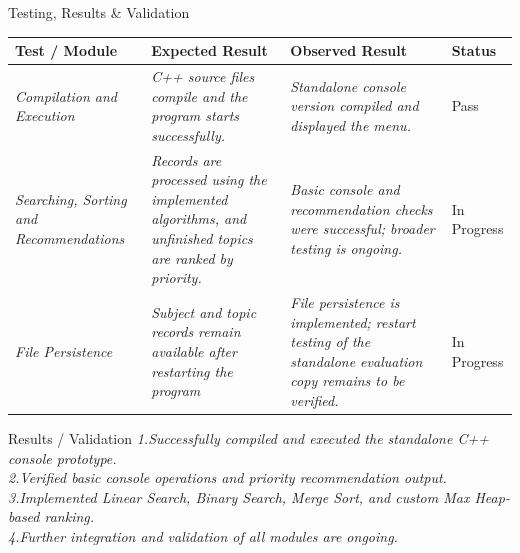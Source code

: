 \documentclass[aspectratio=169,11pt]{beamer}
\newcommand{\placeholder}[1]{%
\textit{\color{GEUGrey}#1}
}
\begin{document}
\begin{frame}{Testing, Results \& Validation}
\vspace{-0.8cm}
\scriptsize

\begin{center}

\renewcommand{\arraystretch}{1.3}

\begin{tabularx}{.96\textwidth}
{@{}p{2.1cm}X X p{1.4cm}@{}}

\toprule
Test / Module &
Expected Result &
Observed Result &
Status\\
\midrule

\placeholder{Compilation and Execution} &
\placeholder{C++ source files compile and the program starts successfully.} &
\placeholder{Standalone console version compiled and displayed the menu.} &
Pass\\

\placeholder{Searching, Sorting and Recommendations} &
\placeholder{Records are processed using the implemented algorithms, and unfinished topics are ranked by priority.} &
\placeholder{Basic console and recommendation checks were successful; broader testing is ongoing.} &
In Progress\\

\placeholder{File Persistence} &
\placeholder{Subject and topic records remain available after restarting the program} &
\placeholder{File persistence is implemented; restart testing of the standalone evaluation copy remains to be verified.} &
In Progress\\

\bottomrule

\end{tabularx}

\end{center}

\vspace{0mm}

\begin{block}{Results / Validation}
\placeholder{
1.Successfully compiled and executed the standalone C++ console prototype.\\2.Verified basic console operations and priority recommendation output.\\3.Implemented Linear Search, Binary Search, Merge Sort, and custom Max Heap-based ranking.\\4.Further integration and validation of all modules are ongoing.
}
\end{block}


\end{frame}
\end{document}
